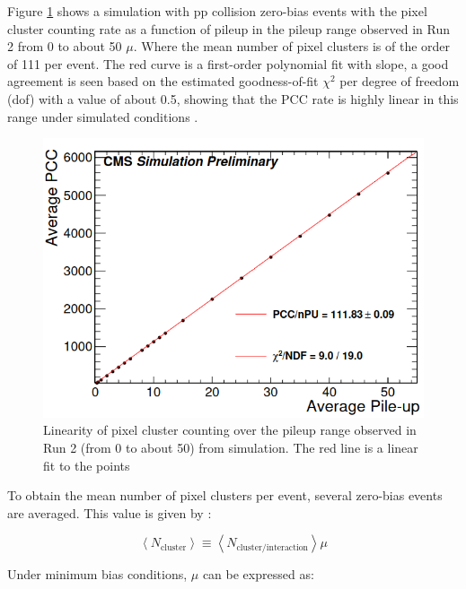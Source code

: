 Figure \ref{pileup} shows a simulation with pp collision zero-bias events with the pixel cluster counting rate as a function of pileup in the pileup range observed in Run 2 from 0 to about 50 $\mu$. Where the mean number of pixel clusters is of the order of  111 per event. The red curve is a first-order polynomial fit with slope, a good agreement is seen based on the estimated goodness-of-fit $\chi^{2}$ per degree of freedom (dof) with a value of about 0.5, showing that the PCC rate is highly linear in this range under simulated conditions \cite{ Phase2_Upgrade,lumi_precise_2015_2016}.

\begin{center}
  \begin{figure}[h!]
    \centering
    \includegraphics[scale=.35]{Chapter3/pileup_lineality.png} 
    \caption[PCC linearity with pile-up]{ Linearity of pixel cluster counting over the pileup range observed in Run 2 (from 0 to about 50) from simulation. The red line is a linear fit to the points \cite{Phase2_Upgrade} }
    \label{pileup}
  \end{figure}
\end{center}

To obtain the mean number of pixel clusters per event, several zero-bias events are averaged. This value is given by :

\begin{equation}
\left < N_{\text{cluster}} \right > \equiv \left < N_{\text{cluster}/\text{interaction}} \right > \mu
\end{equation}

Under minimum bias conditions, $\mu$ can be expressed as: 

